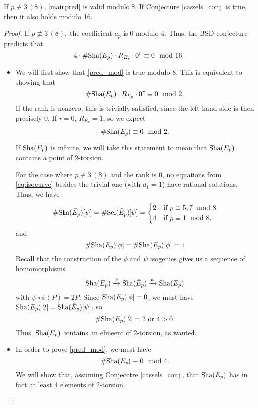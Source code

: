 \documentclass[12pt, a4paper]{report}
\begin{document}
\begin{thm} \label{mainthm2}
  If $p \not\equiv 3 \, (8)$, \autoref{mainpred} is valid modulo 8. If
  Conjecture \autoref{cassels_conj} is true, then it also holds modulo 16.
\end{thm}
\begin{proof}
  If $p \not\equiv 3 \, (8),$ the coefficient $a_p$ is 0 modulo 4.
  Thus,
  the BSD conjecture predicts that
  \begin{equation} \label{pred_mod}
    4 \cdot \#\text{\normalfont Sha}(E_p) \cdot R_{E_p} \cdot 0^r \equiv 0 \mod{16}.
  \end{equation}

  \begin{itemize}
  \item We will first show that \autoref{pred_mod} is true modulo 8. This is
    equivalent to showing that
    \[\# \text{\normalfont Sha}(E_p) \cdot R_{E_p} \cdot 0^r \equiv 0 \mod{2}.\] 
    If the rank
    is nonzero, this is trivially satisfied, since the left hand side is then
    precisely 0. If $r = 0$, $R_{E_p} = 1$, so we expect
    \[\# \text{\normalfont Sha}(E_p) \equiv 0 \mod{2}.\]
    
    If $\text{\normalfont Sha}(E_p)$ is infinite, we will take this statement to mean that $\text{\normalfont Sha}(E_p)$
    contains a point of 2-torsion.
      
    For the case where $p \not\equiv 3 \, (8)$ and the rank is 0, no equations from
    \ref{eq:isocurve} besides the trivial one (with $d_1 = 1$) have rational
    solutions. Thus, we have
    \[\# \text{\normalfont Sha}(\bar{E}_p)[\psi] = \# \text{\normalfont Sel}(\bar{E}_p)[\psi] =
      \begin{cases}
        2 &\text{if } p \equiv 5,7 \mod{8} \\
        4 &\text{if } p \equiv 1 \mod{8}.
      \end{cases}
    \]
    and
    \[\# \text{\normalfont Sha}(E_p)[\phi] = \# \text{\normalfont Sha}(E_p)[\phi] = 1\] Recall that the construction
    of the $\phi$ and $\psi$ isogenies gives us a sequence of homomorphisms
    \[\text{\normalfont Sha}(E_p) \xrightarrow{\phi} \text{\normalfont Sha}(\bar{E}_p) \xrightarrow{\psi}
      \text{\normalfont Sha}(E_p)\] with $\psi \circ \phi (P) = 2P.$ Since $\text{\normalfont Sha}(E_p)[\phi] = 0$,
    we must have $\text{\normalfont Sha}(E_p)[2] = \text{\normalfont Sha}(\bar{E}_p)[\psi]$, so
    \[\# \text{\normalfont Sha}(E_p)[2] = 2 \text { or } 4 > 0.\]
    Thus, $\text{\normalfont Sha}(E_p)$ contains an elmeent of 2-torsion, as wanted.

  \item In order to prove \autoref{pred_mod}, we must have
    \[\# \text{\normalfont Sha}(E_p) \equiv 0 \mod{4}.\]
    We will show that, assuming Conjecutre \autoref{cassels_conj}, 
    that $\text{\normalfont Sha}(E_p)$ has in fact at least 4 elements of 2-torsion. 


\end{itemize}
\end{proof}
\end{document}
